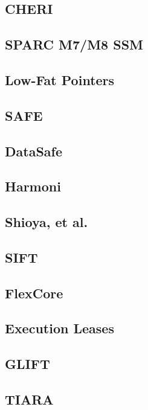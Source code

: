 \subsection{CHERI}

\subsection{SPARC M7/M8 SSM}

\subsection{Low-Fat Pointers}

\subsection{SAFE}

\subsection{DataSafe}

\subsection{Harmoni}

\subsection{Shioya, et al.}

\subsection{SIFT}

\subsection{FlexCore}

\subsection{Execution Leases}

\subsection{GLIFT}

\subsection{TIARA}

